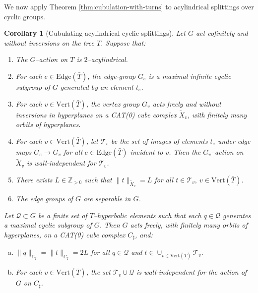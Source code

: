 \documentclass[11pt,oneside]{amsart}
\newcounter{ax}
\newtheorem{cor}[thm]{Corollary}
\theoremstyle{definition}
\newcommand{\field}[1]{\mathbb{#1}}
\newcommand{\integers}{\ensuremath{\field{Z}}}
\newcommand{\vertices}{\mathrm{Vert}}
\newcommand{\edges}{\mathrm{Edge}}
\begin{document}
We now apply Theorem \ref{thm:cubulation-with-turns} to acylindrical splittings over cyclic groups.

\begin{cor}[Cubulating acylindrical cyclic splittings]\label{cor:cyclic-splitting-turns}
Let $G$ act cofinitely and without inversions on the tree $T$.  Suppose that:
\begin{enumerate}
 \item \label{item:cyclic-acyl} The $G$--action on $T$ is $2$--acylindrical.
 
 \item \label{item:cyclic-cyclic} For each $e\in\edges(\bar T)$, the edge-group $G_e$ is a maximal infinite cyclic subgroup of $G$ generated by an element $t_e$.
 
 
 \item \label{item:cyclic-vertices} For each $v\in\vertices(\bar T)$, the vertex group $G_v$ acts freely and without inversions in hyperplanes on a CAT(0) cube complex $\widetilde X_v$, with finitely many orbits of hyperplanes.
 
 \item \label{item:cyclic-vertices} For each $v\in\vertices(\bar T)$, let $\mathcal T_v$ be the set of images of elements $t_e$ under edge maps $G_e\to G_v$ for all $e\in\edges(\bar T)$ incident to $v$.  Then the $G_v$--action on $\widetilde X_v$ is wall-independent for $\mathcal T_v$.
 
 
 \item There exists $L\in\integers_{>0}$ such that $\|t\|_{\widetilde X_v}=L$ for all $t\in\mathcal T_v,\ v\in\vertices(\bar T)$.  \label{item:cyclic-length}

 \item \label{item:separable-edge-groups}  The edge groups of $G$ are separable in $G$.
\end{enumerate}
Let $\mathcal Q\subset G$ be a finite set of $T$--hyperbolic elements such that each $q\in\mathcal Q$ generates a maximal cyclic subgroup of $G$. Then $G$ acts freely, with finitely many orbits of hyperplanes, on a CAT(0) cube complex $C_\sharp$, and:
\begin{enumerate}[(a)]
 \item \label{item:cyclic-conclusion-equalised} $\|q\|_{C_\sharp}=\|t\|_{C_\sharp}=2L$ for all $q\in\mathcal Q$ and $t\in\cup_{v\in\vertices(\bar T)}\mathcal T_v$.
 
 \item \label{item:cyclic-conclusion-independence} For each $v\in\vertices(\bar T)$, the set $\mathcal T_v\cup\mathcal Q$ is wall-independent for the action of $G$ on $C_\sharp$.
\end{enumerate}

\end{cor}
\end{document}
